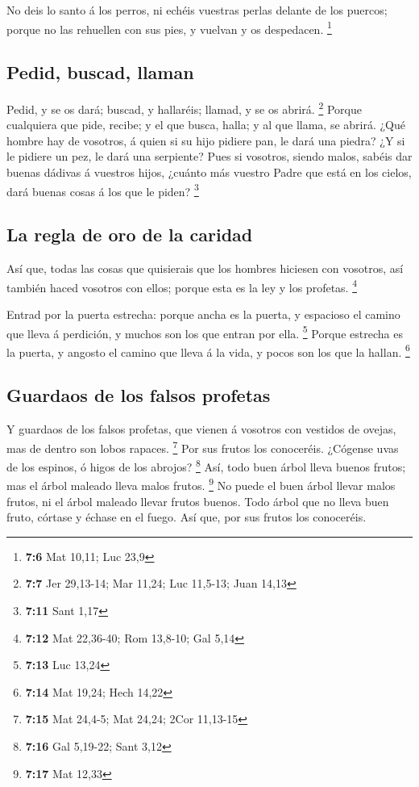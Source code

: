  No deis lo santo á los perros, ni echéis vuestras perlas
delante de los puercos; porque no las rehuellen con sus pies, y vuelvan
y os despedacen. \footnote{\textbf{7:6} Mat 10,11; Luc 23,9}

\hypertarget{pedid-buscad-llaman}{%
\subsection{Pedid, buscad, llaman}\label{pedid-buscad-llaman}}

 Pedid, y se os dará; buscad, y hallaréis; llamad, y se os
abrirá. \footnote{\textbf{7:7} Jer 29,13-14; Mar 11,24; Luc 11,5-13;
  Juan 14,13}  Porque cualquiera que pide, recibe; y el que
busca, halla; y al que llama, se abrirá.  ¿Qué hombre hay de
vosotros, á quien si su hijo pidiere pan, le dará una piedra?
 ¿Y si le pidiere un pez, le dará una serpiente?
 Pues si vosotros, siendo malos, sabéis dar buenas dádivas
á vuestros hijos, ¿cuánto más vuestro Padre que está en los cielos, dará
buenas cosas á los que le piden? \footnote{\textbf{7:11} Sant 1,17}

\hypertarget{la-regla-de-oro-de-la-caridad}{%
\subsection{La regla de oro de la
caridad}\label{la-regla-de-oro-de-la-caridad}}

 Así que, todas las cosas que quisierais que los hombres
hiciesen con vosotros, así también haced vosotros con ellos; porque esta
es la ley y los profetas. \footnote{\textbf{7:12} Mat 22,36-40; Rom
  13,8-10; Gal 5,14}

 Entrad por la puerta estrecha: porque ancha es la puerta,
y espacioso el camino que lleva á perdición, y muchos son los que entran
por ella. \footnote{\textbf{7:13} Luc 13,24}  Porque
estrecha es la puerta, y angosto el camino que lleva á la vida, y pocos
son los que la hallan. \footnote{\textbf{7:14} Mat 19,24; Hech 14,22}

\hypertarget{guardaos-de-los-falsos-profetas}{%
\subsection{Guardaos de los falsos
profetas}\label{guardaos-de-los-falsos-profetas}}

 Y guardaos de los falsos profetas, que vienen á vosotros
con vestidos de ovejas, mas de dentro son lobos rapaces. \footnote{\textbf{7:15}
  Mat 24,4-5; Mat 24,24; 2Cor 11,13-15}  Por sus frutos los
conoceréis. ¿Cógense uvas de los espinos, ó higos de los abrojos?
\footnote{\textbf{7:16} Gal 5,19-22; Sant 3,12}  Así, todo
buen árbol lleva buenos frutos; mas el árbol maleado lleva malos frutos.
\footnote{\textbf{7:17} Mat 12,33}  No puede el buen árbol
llevar malos frutos, ni el árbol maleado llevar frutos buenos.
 Todo árbol que no lleva buen fruto, córtase y échase en el
fuego.  Así que, por sus frutos los conoceréis.

